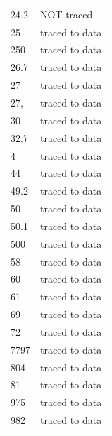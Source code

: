 \documentclass[10pt]{article}
\begin{document}
{\begin{longtable}{p{4cm}p{5cm}}
24.2 & NOT traced \\
25 & traced to data \\
250 & traced to data \\
26.7 & traced to data \\
27 & traced to data \\
27, & traced to data \\
30 & traced to data \\
32.7 & traced to data \\
4 & traced to data \\
44 & traced to data \\
49.2 & traced to data \\
50 & traced to data \\
50.1 & traced to data \\
500 & traced to data \\
58 & traced to data \\
60 & traced to data \\
61 & traced to data \\
69 & traced to data \\
72 & traced to data \\
7797 & traced to data \\
804 & traced to data \\
81 & traced to data \\
975 & traced to data \\
982 & traced to data \\
\bottomrule\end{longtable}}
\end{document}
